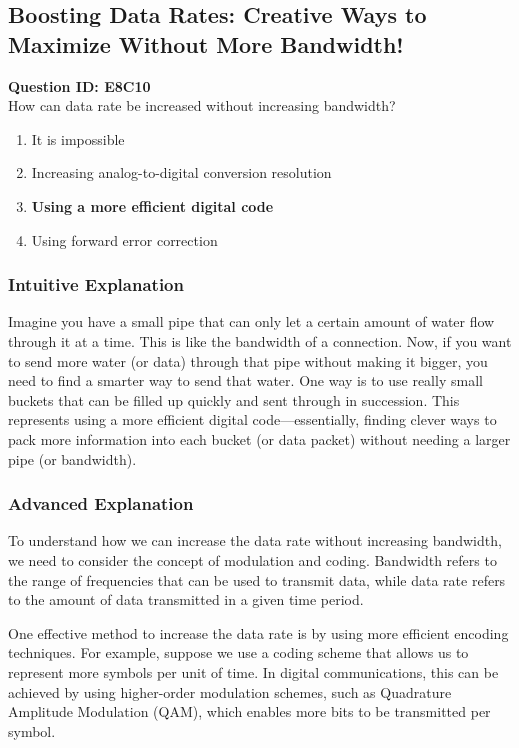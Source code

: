 \subsection{Boosting Data Rates: Creative Ways to Maximize Without More Bandwidth!}

\begin{tcolorbox}
\textbf{Question ID: E8C10}\\
How can data rate be increased without increasing bandwidth?\\
\begin{enumerate}[label=\Alph*.]
    \item It is impossible
    \item Increasing analog-to-digital conversion resolution
    \item \textbf{Using a more efficient digital code}
    \item Using forward error correction
\end{enumerate}
\end{tcolorbox}

\subsubsection{Intuitive Explanation}
Imagine you have a small pipe that can only let a certain amount of water flow through it at a time. This is like the bandwidth of a connection. Now, if you want to send more water (or data) through that pipe without making it bigger, you need to find a smarter way to send that water. One way is to use really small buckets that can be filled up quickly and sent through in succession. This represents using a more efficient digital code—essentially, finding clever ways to pack more information into each bucket (or data packet) without needing a larger pipe (or bandwidth).

\subsubsection{Advanced Explanation}
To understand how we can increase the data rate without increasing bandwidth, we need to consider the concept of modulation and coding. Bandwidth refers to the range of frequencies that can be used to transmit data, while data rate refers to the amount of data transmitted in a given time period.

One effective method to increase the data rate is by using more efficient encoding techniques. For example, suppose we use a coding scheme that allows us to represent more symbols per unit of time. In digital communications, this can be achieved by using higher-order modulation schemes, such as Quadrature Amplitude Modulation (QAM), which enables more bits to be transmitted per symbol.

